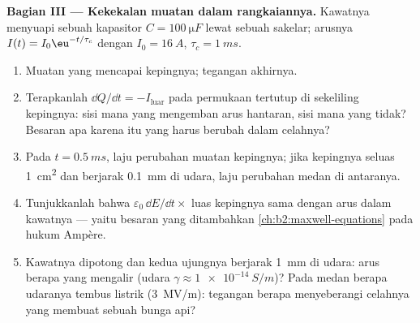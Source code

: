 \begin{problem}
\medskip
\noindent\textbf{Bagian III --- Kekekalan muatan dalam rangkaiannya.}
Kawatnya menyuapi sebuah kapasitor $C = \qty{100}{\micro F}$ lewat sebuah sakelar;
arusnya $I(t) = I_0\eu^{-t/\tau_c}$ dengan $I_0 = \qty{16}{A}$, $\tau_c = \qty{1}{ms}$.
\begin{enumerate}[resume]
  \item Muatan yang mencapai kepingnya; tegangan akhirnya.
  \item Terapkanlah $\dd Q/\dd t = -I_{\text{luar}}$ pada permukaan tertutup di sekeliling
        kepingnya: sisi mana yang mengemban arus hantaran, sisi mana yang tidak?
        Besaran apa karena itu yang harus berubah dalam celahnya?
  \item Pada $t = \qty{0.5}{ms}$, laju perubahan muatan kepingnya; jika
        kepingnya seluas \qty{1}{cm^2} dan berjarak \qty{0.1}{mm} di udara, laju
        perubahan medan di antaranya.
  \item Tunjukkanlah bahwa $\varepsilon_0\,\dd E/\dd t \times$ luas kepingnya sama dengan arus
        dalam kawatnya --- yaitu besaran yang ditambahkan
        \cref{ch:b2:maxwell-equations} pada hukum Ampère.
  \item Kawatnya dipotong dan kedua ujungnya berjarak \qty{1}{mm} di udara:
        arus berapa yang mengalir (udara $\gamma \approx \qty{1e-14}{S/m}$)? Pada
        medan berapa udaranya tembus listrik (\qty{3}{MV/m}): tegangan berapa menyeberangi
        celahnya yang membuat sebuah bunga api?
\end{enumerate}


\end{problem}
